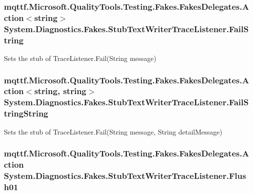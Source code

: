 \hypertarget{class_system_1_1_diagnostics_1_1_fakes_1_1_stub_text_writer_trace_listener_a9009dd4ba9ce9f4bd0562ec1e7d93ddf}{
\subsubsection[{Fail\-String}]{\setlength{\rightskip}{0pt plus 5cm}mqttf.\-Microsoft.\-Quality\-Tools.\-Testing.\-Fakes.\-Fakes\-Delegates.\-Action$<$string$>$ System.\-Diagnostics.\-Fakes.\-Stub\-Text\-Writer\-Trace\-Listener.\-Fail\-String}}\label{class_system_1_1_diagnostics_1_1_fakes_1_1_stub_text_writer_trace_listener_a9009dd4ba9ce9f4bd0562ec1e7d93ddf}


Sets the stub of Trace\-Listener.\-Fail(\-String message)

\hypertarget{class_system_1_1_diagnostics_1_1_fakes_1_1_stub_text_writer_trace_listener_ae44f7757c0162d843444891df3441b2c}{
\subsubsection[{Fail\-String\-String}]{\setlength{\rightskip}{0pt plus 5cm}mqttf.\-Microsoft.\-Quality\-Tools.\-Testing.\-Fakes.\-Fakes\-Delegates.\-Action$<$string, string$>$ System.\-Diagnostics.\-Fakes.\-Stub\-Text\-Writer\-Trace\-Listener.\-Fail\-String\-String}}\label{class_system_1_1_diagnostics_1_1_fakes_1_1_stub_text_writer_trace_listener_ae44f7757c0162d843444891df3441b2c}


Sets the stub of Trace\-Listener.\-Fail(\-String message, String detail\-Message)

\hypertarget{class_system_1_1_diagnostics_1_1_fakes_1_1_stub_text_writer_trace_listener_a63433756be6379b1d2479191d5c5a6fb}{
\subsubsection[{Flush01}]{\setlength{\rightskip}{0pt plus 5cm}mqttf.\-Microsoft.\-Quality\-Tools.\-Testing.\-Fakes.\-Fakes\-Delegates.\-Action System.\-Diagnostics.\-Fakes.\-Stub\-Text\-Writer\-Trace\-Listener.\-Flush01}}\label{class_system_1_1_diagnostics_1_1_fakes_1_1_stub_text_writer_trace_listener_a63433756be6379b1d2479191d5c5a6fb}


